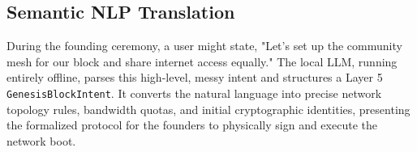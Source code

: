 \subsection{Semantic NLP Translation}
During the founding ceremony, a user might state, "Let's set up the community mesh for our block and share internet access equally." The local LLM, running entirely offline, parses this high-level, messy intent and structures a Layer 5 \texttt{GenesisBlockIntent}. It converts the natural language into precise network topology rules, bandwidth quotas, and initial cryptographic identities, presenting the formalized protocol for the founders to physically sign and execute the network boot.
